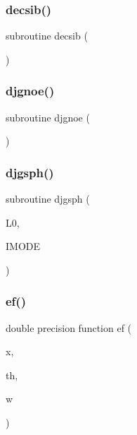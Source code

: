 \mbox{\label{sophia_8f_a0992e3777708845cc43933feef2f520a}} 
\subsubsection{\texorpdfstring{decsib()}{decsib()}}
{\footnotesize\ttfamily subroutine decsib (\begin{DoxyParamCaption}{ }\end{DoxyParamCaption})}

\mbox{\label{sophia_8f_abf05c3377851b60a996934fb64c95b40}} 
\subsubsection{\texorpdfstring{djgnoe()}{djgnoe()}}
{\footnotesize\ttfamily subroutine djgnoe (\begin{DoxyParamCaption}{ }\end{DoxyParamCaption})}

\mbox{\label{sophia_8f_abe318bfad781fc9eb048ee5ee8b30827}} 
\subsubsection{\texorpdfstring{djgsph()}{djgsph()}}
{\footnotesize\ttfamily subroutine djgsph (\begin{DoxyParamCaption}\item[{}]{L0,  }\item[{}]{I\+M\+O\+DE }\end{DoxyParamCaption})}

\mbox{\label{sophia_8f_a7e32b615d6a5eec59e547bc1d23c7926}} 
\subsubsection{\texorpdfstring{ef()}{ef()}}
{\footnotesize\ttfamily double precision function ef (\begin{DoxyParamCaption}\item[{}]{x,  }\item[{}]{th,  }\item[{}]{w }\end{DoxyParamCaption})}

